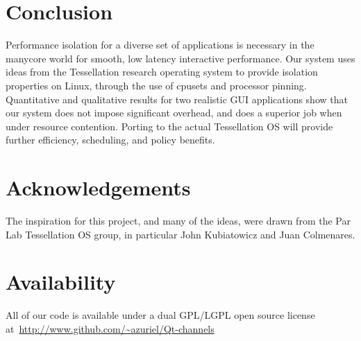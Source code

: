 \documentclass[letterpaper,twocolumn,11pt]{article}
\begin{document}


\section{Conclusion}

Performance isolation for a diverse set of applications is necessary in the manycore world for smooth, low latency interactive performance. Our system uses ideas from the Tessellation research operating system to provide isolation properties on Linux, through the use of cpusets and processor pinning. Quantitative and qualitative results for two realistic GUI applications show that our system does not impose significant overhead, and does a superior job when under resource contention. Porting to the actual Tessellation OS will provide further efficiency, scheduling, and policy benefits.

\section{Acknowledgements}

The inspiration for this project, and many of the ideas, were drawn from the Par Lab Tessellation OS group, in particular John Kubiatowicz and Juan Colmenares. 

\section{Availability}

All of our code is available under a dual GPL/LGPL open source license at~\url{http://www.github.com/~azuriel/Qt-channels}

\footnotesize{
}

\end{document}
